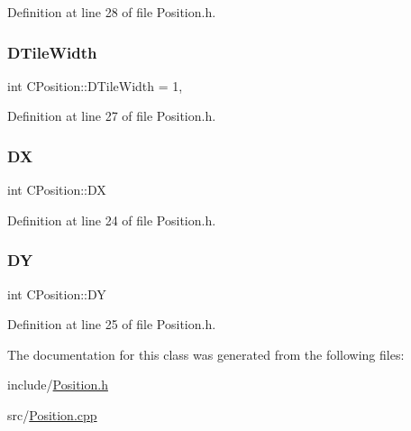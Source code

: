 Definition at line 28 of file Position.\+h.

\hypertarget{classCPosition_ac17d12fb5d35fcf62d63bb42e8cf7ed6}{}\label{classCPosition_ac17d12fb5d35fcf62d63bb42e8cf7ed6} 
\subsubsection{\texorpdfstring{D\+Tile\+Width}{DTileWidth}}
{\footnotesize\ttfamily int C\+Position\+::\+D\+Tile\+Width = 1\hspace{0.3cm}{\ttfamily [static]}, {\ttfamily [protected]}}



Definition at line 27 of file Position.\+h.

\hypertarget{classCPosition_a28445f9b872169715919074d82044eda}{}\label{classCPosition_a28445f9b872169715919074d82044eda} 
\subsubsection{\texorpdfstring{DX}{DX}}
{\footnotesize\ttfamily int C\+Position\+::\+DX\hspace{0.3cm}{\ttfamily [protected]}}



Definition at line 24 of file Position.\+h.

\hypertarget{classCPosition_a84139c9e8eb547e7cf3cb851739943a4}{}\label{classCPosition_a84139c9e8eb547e7cf3cb851739943a4} 
\subsubsection{\texorpdfstring{DY}{DY}}
{\footnotesize\ttfamily int C\+Position\+::\+DY\hspace{0.3cm}{\ttfamily [protected]}}



Definition at line 25 of file Position.\+h.



The documentation for this class was generated from the following files\+:\begin{DoxyCompactItemize}
\item 
include/\hyperlink{Position_8h}{Position.\+h}\item 
src/\hyperlink{Position_8cpp}{Position.\+cpp}\end{DoxyCompactItemize}
